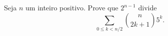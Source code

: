 Seja \( n \) um inteiro positivo. Prove que \( 2^{n-1} \) divide
\[ \sum_{0\leq k < n/2} \binom{n}{2k+1}5^k. \]
